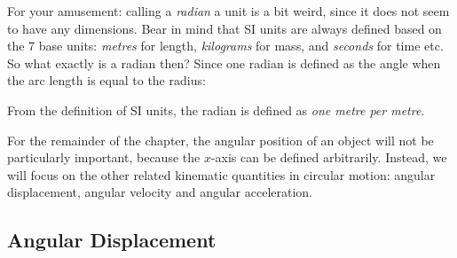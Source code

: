 \begin{remark}
  For your amusement: calling a \emph{radian} a unit is a bit weird, since it
  does not seem to have any dimensions. Bear in mind that SI units are always
  defined based on the 7 base units: \emph{metres} for length, \emph{kilograms}
  for mass, and \emph{seconds} for time etc. So what exactly is a radian then?
  Since one radian is defined as the angle when the arc length is equal to the
  radius:
  \begin{center}
  \end{center}
  From the definition of SI units, the radian is defined as
  \emph{one metre per metre}.
\end{remark}

For the remainder of the chapter, the angular position of an object will not be
particularly important, because the $x$-axis can be defined arbitrarily.
Instead, we will focus on the other related kinematic quantities in circular
motion: angular displacement, angular velocity and angular acceleration.


\subsection{Angular Displacement}

